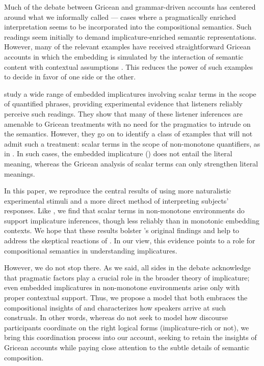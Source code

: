 \documentclass[leqno]{article}
\begin{document}
Much of the debate between Gricean and grammar-driven accounts has
centered around what we informally called 
--- cases where a pragmatically enriched interpretation seems to be
incorporated into the compositional semantics. Such readings seem
initially to demand implicature-enriched semantic representations.
However, many of the relevant examples have received straightforward
Gricean accounts in which the embedding is simulated by the
interaction of semantic content with contextual assumptions
\citep{Russell06,Geurts09}. This reduces the power of such examples to
decide in favor of one side or the other.

\citet{Chemla:Spector:2011} study a wide range of embedded
implicatures involving scalar terms in the scope of quantified
phrases, providing experimental evidence that listeners reliably
perceive such readings. They show that many of these listener
inferences are amenable to Gricean treatments with no need for the
pragmatics to intrude on the semantics. However, they go on to
identify a class of examples that will not admit such a treatment:
scalar terms in the scope of non-monotone quantifiers, as in
. In such cases, the
embedded implicature ()
does not entail the literal meaning, whereas the Gricean analysis of
scalar terms can only strengthen literal meanings.

In this paper, we reproduce the central results of
\citet{Chemla:Spector:2011} using more naturalistic experimental
stimuli and a more direct method of interpreting subjects'
responses. Like \citeauthor{Chemla:Spector:2011}, we find that scalar
terms in non-monotone environments do support implicature inferences,
though less reliably than in monotonic embedding contexts. We hope
that these results bolster \citeauthor{Chemla:Spector:2011}'s original
findings and help to address the skeptical reactions of
\citet{geurts-vantiel:2013:scalar}. In our view, this evidence points
to a role for compositional semantics in understanding implicatures.

However, we do not stop there. As we said, all sides in the debate
acknowledge that pragmatic factors play a crucial role in the broader
theory of implicature; even embedded implicatures in non-monotone
environments arise only with proper contextual support. Thus, we
propose a model that both embraces the compositional insights of
\citeauthor{ChierchiaFoxSpector08} and characterizes how speakers
arrive at such construals. In other words, whereas
\citeauthor{ChierchiaFoxSpector08} do not seek to model how discourse
participants coordinate on the right logical forms (implicature-rich
or not), we bring this coordination process into our account, seeking
to retain the insights of Gricean accounts while paying close
attention to the subtle details of semantic composition.
\end{document}
